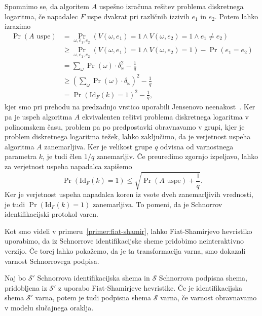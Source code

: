 \begin{dokaz}
    Spomnimo se, da algoritem $A$ uspešno izračuna rešitev problema diskretnega logaritma, če napadalec
    $F$ uspe dvakrat pri različnih izzivih $e_1$ in $e_2$. Potem lahko izrazimo
    \begin{align*}
        \Pr(A \text{ uspe}) &=
            \Pr_{\omega, e_1, e_2}(V(\omega, e_1) = 1 \land V(\omega, e_2) = 1 \land e_1 \neq e_2) \\
                                  &\geq \Pr_{\omega, e_1, e_2}(V(\omega, e_1) = 1 \land V(\omega, e_2) = 1) - \Pr(e_1 = e_2) \\
                                  &= \sum_{\omega} \Pr(\omega) \cdot \delta_{\omega}^2 - \frac{1}{q} \\
                                  &\geq (\sum_{\omega} \Pr(\omega) \cdot \delta_{\omega})^2 - \frac{1}{q} \\
                                  &= \Pr(\text{Id}_F(k) = 1)^2 - \frac{1}{q},
    \end{align*}
    kjer smo pri prehodu na predzadnjo vrstico uporabili Jensenovo neenakost~\cite{jensen}.
    Ker pa je uspeh algoritma $A$ ekvivalenten rešitvi problema diskretnega logaritma v polinomskem
    času, problem pa po predpostavki obravnavamo v grupi, kjer je problem diskretnega logaritma težek,
    lahko zaključimo, da je verjetnost uspeha algoritma $A$ zanemarljiva. Ker je velikost grupe $q$
    odvisna od varnostnega parametra $k$, je tudi člen $1/q$ zanemarljiv. Če preuredimo zgornjo izpeljavo,
    lahko za verjetnost uspeha napadalca zapišemo
    $$
    \Pr(\text{Id}_F(k) = 1) \leq \sqrt{\Pr(A \text{ uspe}) + \frac{1}{q}}.
    $$
    Ker je verjetnost uspeha napadalca koren iz vsote dveh zanemarljivih vrednosti, je tudi
    $\Pr(\text{Id}_F(k) = 1)$ zanemarljiva. To pomeni, da je  Schnorrov identifikacijski protokol varen.
\end{dokaz}

Kot smo videli v primeru~\ref{primer:fiat-shamir}, lahko Fiat-Shamirjevo hevristiko uporabimo, da
iz Schnorrove identifikacijske sheme pridobimo neinteraktivno verzijo. Če torej lahko pokažemo,
da je ta transformacija varna, smo dokazali varnost Schnorrovega podpisa.

\begin{izrek}
\label{izrek:fiat-shamir-sec}
    Naj bo $\mathcal{S'}$ Schnorrova identifikacijska shema in $\mathcal{S}$ Schnorrova podpisna
    shema, pridobljena iz $\mathcal{S'}$ z uporabo Fiat-Shamirjeve hevristike. Če je identifikacijska
    shema $\mathcal{S'}$ varna, potem je tudi podpisna shema $\mathcal{S}$ varna, če varnost
    obravnavamo v modelu slučajnega oraklja.
\end{izrek}

